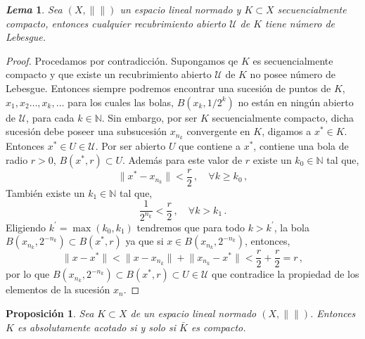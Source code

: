 \documentclass[12pt]{book}
\newtheorem{prop}{\bf Proposición}[chapter]
\newtheorem{lema}{\it Lema}[chapter]
\def\NN{\mathbb{N}}
\newcommand{\norm}[1]{\lVert #1\rVert }
\begin{document}
 \begin{lema} Sea $(X,\norm{})$ un espacio lineal normado y $K\subset X$ secuencialmente 
compacto, entonces cualquier recubrimiento abierto $\mathcal{U}$ de $K$ tiene número de 
Lebesgue.
 \end{lema}
 \begin{proof}

 Procedamos por contradicción. Supongamos qe $K$ es secuencialmente compacto y que existe 
un recubrimiento abierto $\mathcal{U}$ de  $K$ no posee número de Lebesgue. Entonces siempre 
podremos encontrar una sucesión de puntos de $K$, $x_1,x_2\dots,x_k,\dots$ para los cuales las 
bolas, $B(x_k,1/2^k)$  no están en ningún abierto de $\mathcal{U}$, para cada $k\in\NN$. Sin 
embargo, por ser $K$ secuencialmente compacto, dicha sucesión debe poseer una  subsucesión 
$x_{n_k}$ convergente en $K$, digamos a $x^*\in K$. Entonces $x^*\in U\in \mathcal{U}$. Por ser   
abierto $U$ que contiene a $x^*$,   contiene una bola de radio $r>0$, $B(x^*,r)\subset U$. Además 
para este valor de $r$ existe un $k_0\in\NN$ tal que,
 $$\norm{x^*-x_{n_k}}<\frac{r}{2}\,, \quad \forall k\geq k_0\,,$$
 También existe un $k_1\in\NN$ tal  que,
$$\frac{1}{2^{n_k}} <\frac{r}{2}\,,\quad \forall k>k_1\,.$$
Eligiendo  $k^\prime=\max(k_0,k_1)$ tendremos que para todo $k>k^\prime$,  la bola 
$B(x_{n_k},2^{-n_k})\subset B(x^*,r)$  ya que si $x\in  B(x_{n_k},2^{-n_k})$, entonces,
$$\norm{x-x^*}<\norm{x-x_{n_k}}+\norm{x_{n_k}-x^*}<\frac{r}{2} + \frac{r}{2}=r\,,$$
por lo que $B(x_{n_k}, 2^{-n_k})\subset B(x^*,r)\subset U\in \mathcal{U}$ que contradice la 
propiedad de los elementos de la sucesión $x_n$.
\end{proof}
\begin{prop} Sea $K\subset X$ de un  espacio lineal normado $(X,\norm{})$. Entonces  $K$ es 
absolutamente acotado si y solo si $\bar{K}$  es compacto.
\end{prop}
\end{document}
